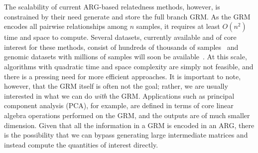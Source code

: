 
The scalability of current ARG-based relatedness methods, however, is constrained by
their need generate and store the full branch GRM. As the GRM encodes all 
pairwise relationships among $n$ samples, it requires at least $O(n^2)$
time and space to compute. 
Several datasets, currently available and of core interest for these 
methods, consist of hundreds of thousands of 
samples~\citep{caulfield2017national,turnbull2018100,
bycroft2018genome,backman2021exome,Ros-Freixedes2022pig_wgs_variants,
halldorsson2022sequences,uk2023whole,all2024genomic}
and genomic datasets with millions of samples will soon be 
available~\citep{stark2024call,cook2025our}.
At this scale, algorithms with quadratic time and space complexity are simply
not feasible, and there is a pressing need for more efficient approaches.
It is important to note, however, that the GRM itself is often not the goal;
rather, we are usually interested in what we can do \emph{with} the GRM.
Applications such as principal component analysis (PCA), for example, are
defined in terms of core linear algebra operations performed on the GRM,
and the outputs are of much smaller dimension. Given that all the information
in a GRM is encoded in an ARG, there is the possibility that we can bypass
generating large intermediate matrices and instead compute the quantities
of interest directly.



